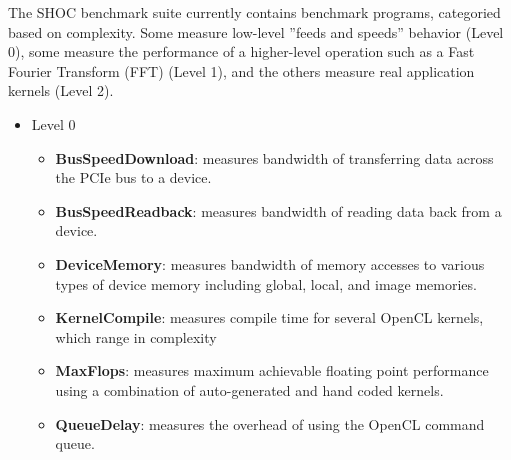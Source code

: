 \documentclass[11pt]{article}
\begin{document}
The SHOC benchmark suite currently contains benchmark programs, categoried
based on complexity.  Some measure low-level ''feeds and speeds'' behavior
(Level 0), some measure the performance of a higher-level operation such 
as a Fast Fourier Transform (FFT) (Level 1), and the others measure 
real application kernels (Level 2).

\newpage 

\begin{itemize}
\item Level 0
    \begin{itemize}
        \item {\bf BusSpeedDownload}: measures bandwidth of transferring data 
         across the PCIe bus to a device.
        \item {\bf BusSpeedReadback}: measures bandwidth of reading data back
        from a device.
        \item {\bf DeviceMemory}: measures bandwidth of memory accesses to 
        various types of device memory including global, local, and image 
        memories.
        \item {\bf KernelCompile}: measures compile time for several OpenCL
        kernels, which range in complexity
        \item {\bf MaxFlops}: measures maximum achievable floating point 
        performance using a combination of auto-generated and hand coded 
        kernels.
        \item {\bf QueueDelay}: measures the overhead of using the OpenCL
        command queue.
    \end{itemize}


\end{itemize}
\end{document}
